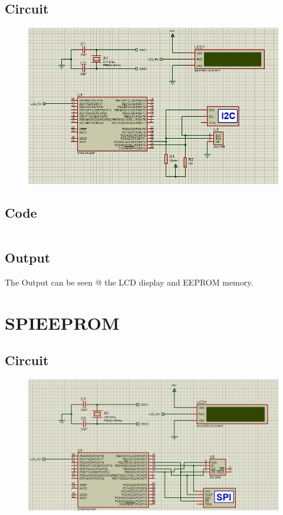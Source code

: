 \documentclass[oneside]{book}
\begin{document}
\subsection{Circuit}
\begin{figure}[H]
    \centering
    \includegraphics[height=0.2\textheight]{I2CEEPROM.png}
\end{figure}
\subsection{Code}
\inputminted[bgcolor=black]{c}{../programFiles/I2CEEPROM.c}

\subsection{Output}
\quad The Output can be seen @ the LCD display and EEPROM memory.


\section{SPIEEPROM}
\subsection{Circuit}
\begin{figure}[H]
    \centering
    \includegraphics[height=0.2\textheight]{SPIEEPROM.png}
\end{figure}
\end{document}
